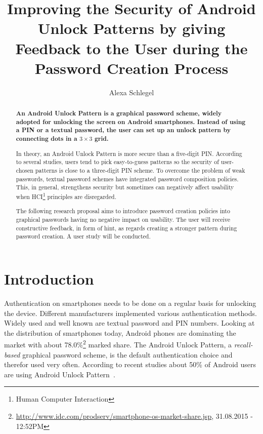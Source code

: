 \documentclass[twocolumn, a4paper, 10pt]{article}
\begin{document}
\title{
	Improving the Security of Android Unlock Patterns by giving Feedback to the User during the Password Creation Process}

\author{
	Alexa Schlegel
}

\maketitle


\def\abstractname{{\textbf Abstract}}
\begin{abstract}
{
\bfseries
An Android Unlock Pattern is a graphical password scheme, widely adopted for unlocking the screen on Android smartphones. Instead of using a PIN or a textual password, the user can set up an unlock pattern by connecting dots in a $3\times3$ grid.

In theory, an Android Unlock Pattern is more secure than a five-digit PIN. According to several studies, users tend to pick easy-to-guess patterns so the security of user-chosen patterns is close to a three-digit PIN scheme. To overcome the problem of weak passwords, textual password schemes have integrated password composition policies. This, in general, strengthens security but sometimes can negatively affect usability when HCI\footnote{Human Computer Interaction} principles are disregarded.

The following research proposal aims to introduce password creation policies into graphical passwords having no negative impact on usability. The user will receive  constructive feedback, in form of hint, as regards creating a stronger pattern during password creation. A user study will be conducted.
}
\end{abstract}


\section{Introduction}
\label{sec:intro}

Authentication on smartphones needs to be done on a regular basis for unlocking the device. Different manufacturers implemented various authentication methods. Widely used and well known are textual password and PIN numbers. Looking at the distribution of smartphones today, Android phones are dominating the market with about 78.0\%\footnote{\url{http://www.idc.com/prodserv/smartphone-os-market-share.jsp}, 31.08.2015 - 12:52PM} marked share. The Android Unlock Pattern, a \textit{recall-based} graphical password scheme, is the default authentication choice and therefor used very often. According to recent studies about 50\% of Android users are using Android Unlock Pattern~\cite{VanBruggen:2013:MSU:2501604.2501614, van2014studying}.
\end{document}
